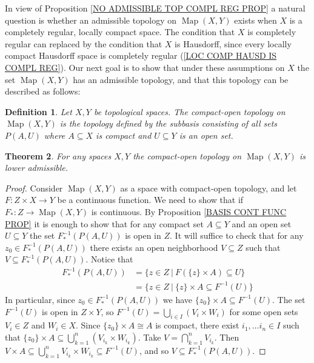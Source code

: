 \documentclass[11pt, letterpaper, oneside]{report}
\theoremstyle{pplain}
\newtheorem{theorem}{Theorem}[chapter]
\newtheorem{ITERMVALUE THM}[theorem]{Intermediate Value Theorem}
\newtheorem{HEINEBOREL THM}[theorem]{Heine-Borel Theorem}
\newtheorem{UMETR THM}[theorem]{Urysohn Metrization Theorem}
\newtheorem{UMETR2 THM}[theorem]{Urysohn Metrization Theorem (v.2)}
\theoremstyle{ddefinition}
\newtheorem{definition}[theorem]{Definition}
\theoremstyle{nnn}
\newtheorem{TDA NN}[theorem]{Topological Data Analysis. }
\theoremstyle{eexercise}
\newcommand{\Map}{\operatorname{Map}}
\begin{document}
In view of Proposition \ref{NO ADMISSIBLE TOP COMPL REG PROP} a natural question is whether 
an admissible topology on $\Map(X, Y)$ exists when $X$ is a completely regular, locally compact space. The condition 
that $X$ is completely regular can replaced by the condition that $X$ is Hausdorff, since every  locally compact Hausdorff space is completely regular (\ref{LOC COMP HAUSD IS COMPL REG}). 
Our next goal is to show that under these assumptions on $X$ the set $\Map(X, Y)$ has an 
admissible topology, and that this topology can be described as follows:

\begin{definition}
Let $X, Y$ be topological spaces. The \emph{compact-open} topology on $\Map(X, Y)$ is the topology defined by 
the subbasis consisting of all sets $P(A, U)$ where $A\subseteq X$ is compact and $U\subseteq Y$ is an open set.  
\end{definition}

\begin{theorem}
\label{COMPACT OPEN LOWER ADMISSIBLE THM} 
For any spaces $X, Y$ the compact-open topology on $\Map(X,Y)$ is lower admissible. 
\end{theorem}

\begin{proof}
Consider  $\Map(X, Y)$  as a space with compact-open topology, and let $F\colon Z\times X \to Y$ 
be a continuous function. We need to show that if $F_{\ast}\colon Z \to \Map(X, Y)$ is continuous. 
By Proposition \ref{BASIS CONT FUNC PROP} it is enough to show that for any  compact set 
$A\subseteq Y$ and an open set $U\subseteq Y$ the set $F_{\ast}^{-1}(P(A, U))$ is open in $Z$.  
It will suffice to check that for any $z_{0}\in F_{\ast}^{-1}(P(A, U))$ there exists an open neighborhood 
$V\subseteq Z$ such that  $V\subseteq  F_{\ast}^{-1}(P(A, U))$. Notice that 
\begin{align*}
F_{\ast}^{-1}(P(A, U)) & = \{z \in Z \ | \ F(\{z\}\times A ) \subseteq U\} \\
&  = \{z \in Z \ | \ \{z\}\times A  \subseteq F^{-1}(U)\} 
\end{align*}
In particular, since  $z_{0}\in F_{\ast}^{-1}(P(A, U))$
we have  $\{z_{0}\}\times A \subseteq  F^{-1}(U)$. The set 
$F^{-1}(U)$ is open in $Z\times Y$, so $F^{-1}(U) = \bigcup_{i\in I} (V_{i}\times W_{i})$ for some open 
sets $V_{i}\in Z$ and $W_{i}\in X$. Since $\{z_{0}\}\times A \cong A$ is compact, there exist
$i_{1}, \dots i_{n}\in I$ such that $\{z_{0}\} \times A \subseteq \bigcup_{k=1}^{n} (V_{i_{k}}\times W_{i_{k}})$. 
Take $V = \bigcap_{k=1}^{n} V_{i_{k}}$. Then $V\times A \subseteq  \bigcup_{k=1}^{n} V_{i_{k}}\times W_{i_{k}} \subseteq F^{-1}(U)$,
and so $V\subseteq F_{\ast}^{-1}(P(A, U))$. 
\end{proof}
\end{document}

